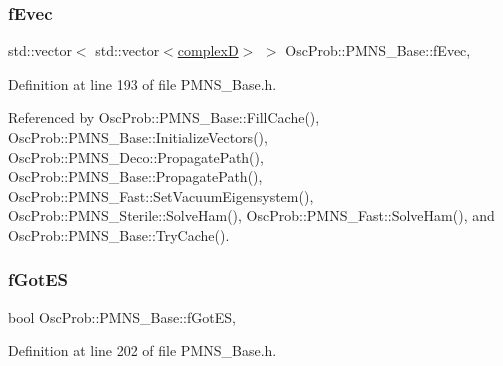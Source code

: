 \mbox{\label{classOscProb_1_1PMNS__Base_a87be137356c5f27ab83cab5e1298ef8f}} 
\subsubsection{\texorpdfstring{f\+Evec}{fEvec}}
{\footnotesize\ttfamily std\+::vector$<$ std\+::vector$<$\hyperlink{EigenPoint_8h_a67ca8e107e20610c3fff78d5e726ece0}{complexD}$>$ $>$ Osc\+Prob\+::\+P\+M\+N\+S\+\_\+\+Base\+::f\+Evec\hspace{0.3cm}{\ttfamily [protected]}, {\ttfamily [inherited]}}



Definition at line 193 of file P\+M\+N\+S\+\_\+\+Base.\+h.



Referenced by Osc\+Prob\+::\+P\+M\+N\+S\+\_\+\+Base\+::\+Fill\+Cache(), Osc\+Prob\+::\+P\+M\+N\+S\+\_\+\+Base\+::\+Initialize\+Vectors(), Osc\+Prob\+::\+P\+M\+N\+S\+\_\+\+Deco\+::\+Propagate\+Path(), Osc\+Prob\+::\+P\+M\+N\+S\+\_\+\+Base\+::\+Propagate\+Path(), Osc\+Prob\+::\+P\+M\+N\+S\+\_\+\+Fast\+::\+Set\+Vacuum\+Eigensystem(), Osc\+Prob\+::\+P\+M\+N\+S\+\_\+\+Sterile\+::\+Solve\+Ham(), Osc\+Prob\+::\+P\+M\+N\+S\+\_\+\+Fast\+::\+Solve\+Ham(), and Osc\+Prob\+::\+P\+M\+N\+S\+\_\+\+Base\+::\+Try\+Cache().

\mbox{\label{classOscProb_1_1PMNS__Base_a6dc5cd010d2d70b2324745b4e53e9839}} 
\subsubsection{\texorpdfstring{f\+Got\+ES}{fGotES}}
{\footnotesize\ttfamily bool Osc\+Prob\+::\+P\+M\+N\+S\+\_\+\+Base\+::f\+Got\+ES\hspace{0.3cm}{\ttfamily [protected]}, {\ttfamily [inherited]}}



Definition at line 202 of file P\+M\+N\+S\+\_\+\+Base.\+h.



